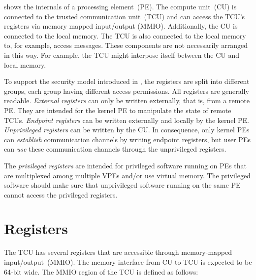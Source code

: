  shows the internals of a processing element~(PE). The compute unit~(CU) is
connected to the trusted communication unit~(TCU) and can access the TCU's registers via memory
mapped input/output (MMIO). Additionally, the CU is connected to the local memory. The TCU is also
connected to the local memory to, for example, access messages. These components are not necessarily
arranged in this way. For example, the TCU might interpose itself between the CU and local memory.

To support the security model introduced in , the registers are split into
different groups, each group having different access permissions. All registers are generally
readable. \emph{External registers} can only be written externally, that is, from a remote PE. They
are intended for the kernel PE to manipulate the state of remote TCUs. \emph{Endpoint registers} can
be written externally and locally by the kernel PE. \emph{Unprivileged registers} can be written by
the CU. In consequence, only kernel PEs can \emph{establish} communication channels by writing
endpoint registers, but user PEs can \emph{use} these communication channels through the
unprivileged registers.

 The \emph{privileged registers} are intended for privileged software running on PEs
that are multiplexed among multiple VPEs and/or use virtual memory. The privileged software should
make sure that unprivileged software running on the same PE cannot access the privileged registers.
\extend{}

\section{Registers}

The TCU has several registers that are accessible through memory-mapped input/output~(MMIO). The
memory interface from CU to TCU is expected to be 64-bit wide. The MMIO region of the TCU is defined
as follows:

